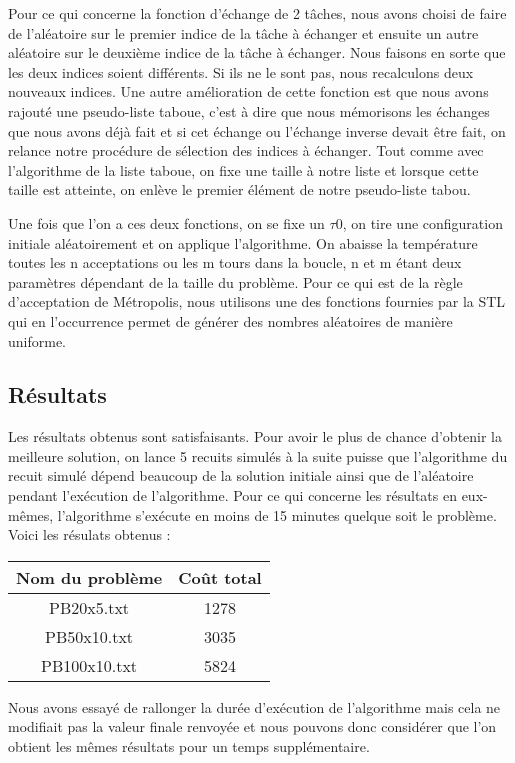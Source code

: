 \documentclass{report}
\begin{document}
Pour ce qui concerne la fonction d'échange de 2 tâches, nous avons choisi de faire de l'aléatoire sur le premier indice
de la tâche à échanger et ensuite un autre aléatoire sur le deuxième indice de la tâche à échanger. Nous faisons en
sorte que les deux indices soient différents. Si ils ne le sont pas, nous recalculons deux nouveaux indices. Une autre
amélioration de cette fonction est que nous avons rajouté une pseudo-liste taboue, c'est à dire que nous mémorisons les
échanges que nous avons déjà fait et si cet échange ou l'échange inverse devait être fait, on relance notre procédure de
sélection des indices à échanger. Tout comme avec l'algorithme de la liste taboue, on fixe une taille à notre liste et lorsque cette taille est atteinte, on enlève le premier élément de notre pseudo-liste tabou.

Une fois que l'on a ces deux fonctions, on se fixe un $\tau 0$, on tire une configuration initiale aléatoirement et on
applique l'algorithme. On abaisse la température toutes les n acceptations ou les m tours dans la boucle, n et m étant
deux paramètres dépendant de la taille du problème. Pour ce qui est de la règle d'acceptation de Métropolis, nous
utilisons une des fonctions fournies par la STL qui en l'occurrence permet de générer des nombres aléatoires de manière uniforme.

\subsection{Résultats}
Les résultats obtenus sont satisfaisants. Pour avoir le plus de chance d'obtenir la meilleure solution, on lance 5
recuits simulés à la suite puisse que l'algorithme du recuit simulé dépend beaucoup de la solution initiale ainsi que de
l'aléatoire pendant l'exécution de l'algorithme. Pour ce qui concerne les résultats en eux-mêmes, l'algorithme s'exécute en moins de 15 minutes quelque soit le problème. Voici les résulats obtenus :\\
\begin{tabular}{|c|c|}
	\hline
	Nom du problème & Coût total\\
	\hline
	PB20x5.txt & 1278 \\
	PB50x10.txt & 3035 \\
	PB100x10.txt & 5824 \\
	\hline
\end{tabular}

Nous avons essayé de rallonger la durée d'exécution de l'algorithme mais cela ne modifiait pas la valeur finale renvoyée
et nous pouvons donc considérer que l'on obtient les mêmes résultats pour un temps supplémentaire.
\end{document}
